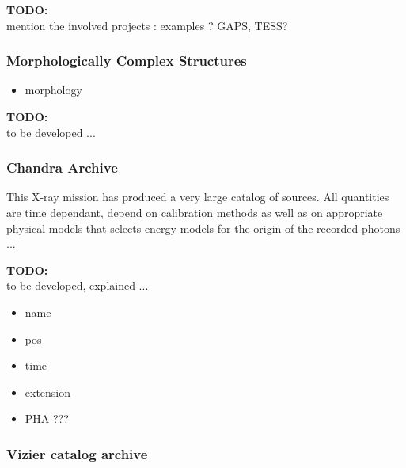 \documentclass[11pt,a4paper]{ivoa}
\newcommand{\TODO}[1]{%
    \noindent%
    \colorbox{todocolor}{%
            \parbox{0.85\linewidth}{\sffamily \textbf{TODO:}\\
            #1}
    }%
    \vspace{2pt}

}
\begin{document}
\TODO{mention the involved projects : examples ? GAPS, TESS? }
\subsubsection{Morphologically Complex Structures}

\begin{itemize}
    \item morphology
\end{itemize}

\TODO{to be developed ...}

\subsubsection{Chandra Archive}
This X-ray mission has produced a very large catalog of sources. %
All quantities are time dependant, depend on calibration methods as well as on appropriate physical
models that selects energy models for the origin of the recorded photons ...


\TODO{to be developed, explained ...}
\begin{itemize}
    \item name
    \item pos
    \item time
    \item extension
    \item PHA ???
\end{itemize}

\subsubsection{Vizier catalog archive  }
\end{document}
